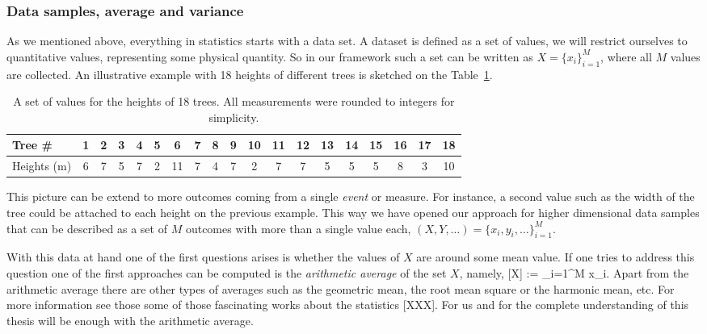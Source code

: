 \subsubsection{Data samples, average and variance}

As we mentioned above, everything in statistics starts with a data set.
A dataset is defined as a set of values, we will restrict ourselves to quantitative values, representing some physical quantity.
So in our framework such a set can be written as $X=\{x_i\}_{i=1}^M$, where all $M$ values are collected.
An illustrative example with 18 heights of different trees is sketched on the Table~\ref{tab:bg-18-trees}.
\begin{table}
  \begin{center}
    \begin{tabular}{| l | c | c | c | c | c | c | c | c | c | c | c | c | c | c | c | c | c | c | }
      \hline
      Tree \# & 1 & 2 & 3 & 4 & 5 & 6 & 7 & 8 & 9 & 10 &  11 &  12 &  13 &  14 &  15 &  16 &  17 &  18
      \\ \hline
      Heights (m) & 6 &  7 &  5 &  7 &  2 & 11 &  7 &  4 &  7 &  2 &  7 &  7 &  5 &  5 &  5 &  8 &  3 & 10 \\ \hline
    \end{tabular}
  \end{center}
  \caption{A set of values for the heights of 18 trees. All measurements were rounded to integers for simplicity.}
  \label{tab:bg-18-trees}
\end{table}

This picture can be extend to more outcomes coming from a single \emph{event} or measure.
For instance, a second value such as the width of the tree could be attached to each height on the previous example.
This way we have opened our approach for higher dimensional data samples that can be described as a set of $M$ outcomes with more than a single value each, $(X,Y,\dots)=\{x_i,y_i,\dots\}_{i=1}^M$.


With this data at hand one of the first questions arises is whether the values of $X$ are around some mean value.
If one tries to address this question one of the first approaches can be computed is the \emph{arithmetic average} of the set $X$, namely,
\be
  [X] := \sum_{i=1}^M x_i.
\ee
Apart from the arithmetic average there are other types of averages such as the geometric mean, the root mean square or the harmonic mean, etc.
For more information see those some of those fascinating works about the statistics [XXX].
For us and for the complete understanding of this thesis will be enough with the arithmetic average.

